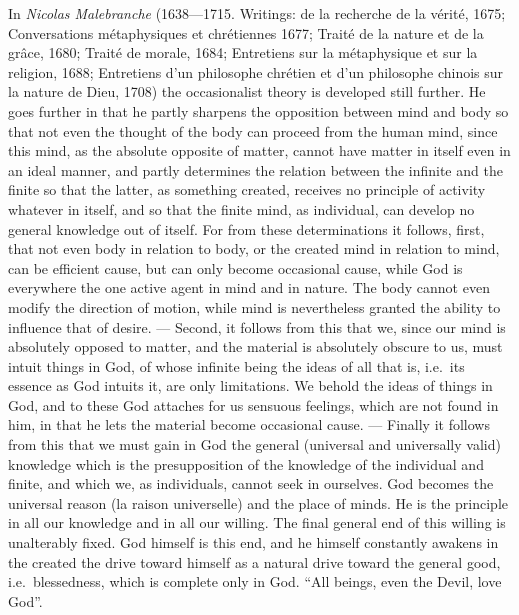 In \emph{Nicolas Malebranche} (1638---1715. Writings: de la recherche de
la vérité, 1675; Conversations métaphysiques et chrétiennes 1677; Traité
de la nature et de la grâce, 1680; Traité de morale, 1684; Entretiens sur
la métaphysique et sur la religion, 1688; Entretiens d'un philosophe
chrétien et d'un philosophe chinois sur la nature de Dieu, 1708) the
occasionalist theory is developed still further. He goes further in
that he partly sharpens the opposition between mind and body so that
not even the thought of the body can proceed from the human mind,
since this mind, as the absolute opposite of matter, cannot have
matter in itself even in an ideal manner, and partly determines the
relation between the infinite and the finite so that the latter, as
something created, receives no principle of activity whatever in
itself, and so that the finite mind, as individual, can develop no
general knowledge out of itself. For from these determinations it
follows, first, that not even body in relation to body, or the created
mind in relation to mind, can be efficient cause, but can only
become occasional cause, while God is everywhere the one active agent in
mind and in nature. The body cannot even modify the direction of
motion, while mind is nevertheless granted the ability to influence
that of desire. --- Second, it follows from this that we,
since our mind is absolutely opposed to matter, and the material is
absolutely obscure to us, must intuit things in God, of whose infinite
being the ideas of all that is, i.e.\ its essence as God intuits it,
are only limitations. We behold the ideas of things in God, and to these
God attaches for us sensuous feelings, which are not found in him, in
that he lets the material become occasional cause. --- Finally it
follows from this that we must gain in God the general (universal and
universally valid) knowledge which is the presupposition of the
knowledge of the individual and finite, and which we, as individuals,
cannot seek in ourselves. God becomes the universal reason (la raison
universelle) and the place of minds. He is the principle in all our
knowledge and in all our willing. The final general end of this willing
is unalterably fixed. God himself is this end, and he himself constantly
awakens in the created the drive toward himself as a natural drive
toward the general good, i.e.\ blessedness, which is complete only in
God. ``All beings, even the Devil, love God''.

